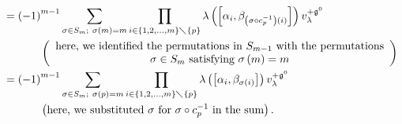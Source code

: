 \documentclass
[numbers=enddot,12pt,final,onecolumn,german,notitlepage]{scrartcl}%
\theoremstyle{definition}
\begin{document}
\begin{align*}
&  =\left(  -1\right)  ^{m-1}\sum\limits_{\sigma\in S_{m};\ \sigma\left(
m\right)  =m}\prod\limits_{i\in\left\{  1,2,...,m\right\}  \diagdown\left\{
p\right\}  }\lambda\left(  \left[  \alpha_{i},\beta_{\left(  \sigma\circ
c_{p}^{-1}\right)  \left(  i\right)  }\right]  \right)  v_{\lambda
}^{+\mathfrak{g}^{0}}\\
&  \ \ \ \ \ \ \ \ \ \ \left(
\begin{array}
[c]{c}%
\text{here, we identified the permutations in }S_{m-1}\text{ with the
permutations}\\
\sigma\in S_{m}\text{ satisfying }\sigma\left(  m\right)  =m
\end{array}
\right) \\
&  =\left(  -1\right)  ^{m-1}\sum\limits_{\sigma\in S_{m};\ \sigma\left(
p\right)  =m}\prod\limits_{i\in\left\{  1,2,...,m\right\}  \diagdown\left\{
p\right\}  }\lambda\left(  \left[  \alpha_{i},\beta_{\sigma\left(  i\right)
}\right]  \right)  v_{\lambda}^{+\mathfrak{g}^{0}}\\
&  \ \ \ \ \ \ \ \ \ \ \left(  \text{here, we substituted }\sigma\text{ for
}\sigma\circ c_{p}^{-1}\text{ in the sum}\right)  .
\end{align*}
\end{document}

